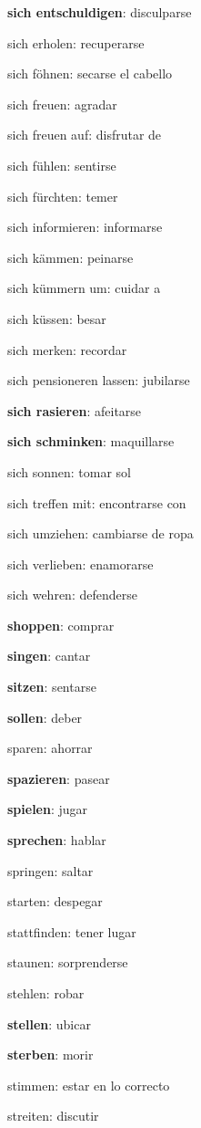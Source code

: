 \begin{multicols}{2}
\begin{myitemize}
\item \textbf{sich entschuldigen}: disculparse
\item sich erholen: recuperarse
\item sich föhnen: secarse el cabello
\item sich freuen: agradar
\item sich freuen auf: disfrutar de
\item sich fühlen: sentirse
\item sich fürchten: temer
\item sich informieren: informarse
\item sich kämmen: peinarse
\item sich kümmern um: cuidar a
\item sich küssen: besar
\item sich merken: recordar
\item sich pensioneren lassen: jubilarse
\item \textbf{sich rasieren}: afeitarse
\item \textbf{sich schminken}: maquillarse
\item sich sonnen: tomar sol
\item sich treffen mit: encontrarse con
\item sich umziehen: cambiarse de ropa
\item sich verlieben: enamorarse
\item sich wehren: defenderse
\item \textbf{shoppen}: comprar
\item \textbf{singen}: cantar
\item \textbf{sitzen}: sentarse
\item \textbf{sollen}: deber
\item sparen: ahorrar
\item \textbf{spazieren}: pasear
\item \textbf{spielen}: jugar
\item \textbf{sprechen}: hablar
\item springen: saltar
\item starten: despegar
\item stattfinden: tener lugar
\item staunen: sorprenderse
\item stehlen: robar
\item \textbf{stellen}: ubicar
\item \textbf{sterben}: morir
\item stimmen: estar en lo correcto
\item streiten: discutir

\end{myitemize}
\end{multicols}
